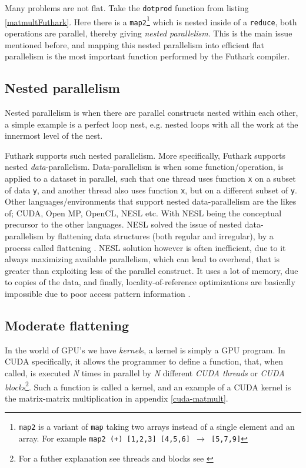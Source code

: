 Many problems are not flat. Take the \texttt{dotprod} function from listing \ref{matmultFuthark}. Here there is a \texttt{map2}\footnote{\texttt{map2} is a variant of \texttt{map} taking two arrays instead of a single element and an array. For example \texttt{map2 (+) [1,2,3] [4,5,6] $\to$ [5,7,9]}} which is nested inside of a \texttt{reduce}, both operations are parallel, thereby giving \textit{nested parallelism}. This is the main issue mentioned before, and mapping this nested parallelism into efficient flat parallelism is the most important function performed by the Futhark compiler. 

\subsection{Nested parallelism}
Nested parallelism is when there are parallel constructs nested within each other, a simple example is a perfect loop nest, e.g. nested loops with all the work at the innermost level of the nest.

Futhark supports such nested parallelism. More specifically, Futhark supports nested \textit{data}-parallelism. Data-parallelism is when some function/operation, is applied to a dataset in parallel, such that one thread uses function \texttt{x} on a subset of data \texttt{y}, and another thread also uses function \texttt{x}, but on a different subset of \texttt{y}. Other languages/environments that support nested data-parallelism are the likes of; CUDA, Open MP, OpenCL, NESL etc. With NESL \cite{nesl} being the conceptual precursor to the other languages. NESL solved the issue of nested data-parallelism by flattening data structures (both regular and irregular), by a process called flattening \cite{flat}. NESL solution however is often inefficient, due to it always maximizing available parallelism, which can lead to overhead, that is greater than exploiting less of the parallel construct. It uses a lot of memory, due to copies of the data, and finally, locality-of-reference optimizations are basically impossible due to poor access pattern information \cite{futhark-moderate-blog}.

\subsection{Moderate flattening}
In the world of GPU's we have \textit{kernel}s, a kernel is simply a GPU program. In CUDA specifically, it allows the programmer to define a function, that, when called, is executed \textit{N} times in parallel by \textit{N} different \textit{CUDA threads} or \textit{CUDA blocks}\footnote{For a futher explanation see threads and blocks see \cite{prog-guide-cuda}}. Such a function is called a kernel, and an example of a CUDA kernel is the matrix-matrix multiplication in appendix \ref{cuda-matmult}. 

